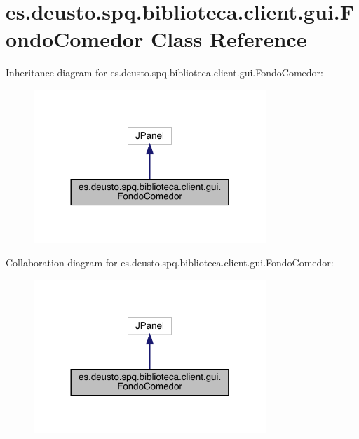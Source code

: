 \hypertarget{classes_1_1deusto_1_1spq_1_1biblioteca_1_1client_1_1gui_1_1_fondo_comedor}{}\section{es.\+deusto.\+spq.\+biblioteca.\+client.\+gui.\+Fondo\+Comedor Class Reference}
\label{classes_1_1deusto_1_1spq_1_1biblioteca_1_1client_1_1gui_1_1_fondo_comedor}


Inheritance diagram for es.\+deusto.\+spq.\+biblioteca.\+client.\+gui.\+Fondo\+Comedor\+:
\nopagebreak
\begin{figure}[H]
\begin{center}
\leavevmode
\includegraphics[width=248pt]{classes_1_1deusto_1_1spq_1_1biblioteca_1_1client_1_1gui_1_1_fondo_comedor__inherit__graph}
\end{center}
\end{figure}


Collaboration diagram for es.\+deusto.\+spq.\+biblioteca.\+client.\+gui.\+Fondo\+Comedor\+:
\nopagebreak
\begin{figure}[H]
\begin{center}
\leavevmode
\includegraphics[width=248pt]{classes_1_1deusto_1_1spq_1_1biblioteca_1_1client_1_1gui_1_1_fondo_comedor__coll__graph}
\end{center}
\end{figure}
